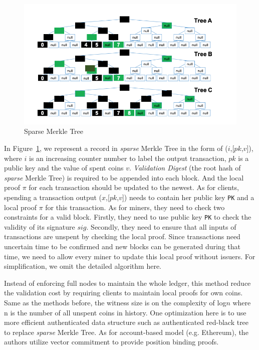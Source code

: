 \documentclass[conference]{IEEEtran}
\begin{document}
\begin{figure}[!ht]
  \centering
  \includegraphics[width=\linewidth]{figs/sparse.png}
  \caption{Sparse Merkle Tree}
  \label{sparse}
\end{figure}

In Figure~\ref{sparse}, we represent a record in \textit{sparse} Merkle Tree in the form of ($i$,[$pk$,$v$]), where $i$ is an increasing counter number to label the output transaction, $pk$ is a public key and the value of spent coins $v$. 
%
\textit{Validation Digest} (the root hash of \textit{sparse} Merkle Tree) is required to be appended into each block.
%
And the local proof $\pi$ for each transaction should be updated to the newest.
%
As for clients, spending a transaction output ($x$,[$pk$,$v$]) needs to contain her public key \texttt{PK} and a local proof $\pi$ for this transaction.
%
As for miners, they need to check two constraints for a valid block.
%
Firstly, they need to use public key \texttt{PK} to check the validity of its signature $sig$.
%
Secondly, they need to ensure that all inputs of transactions are unspent by checking the local proof.
%
Since transactions need uncertain time to be confirmed and new blocks can be generated during that time, we need to allow every miner to update this local proof without issuers.
%
For simplification, we omit the detailed algorithm here.

Instead of enforcing full nodes to maintain the whole ledger, this method reduce the validation cost by requiring clients to maintain local proofs for own coins.
%
Same as the methods before, the witness size is on the complexity of log$n$ where n is the number of all unspent coins in history.
%
One optimization here is to use more efficient authenticated data structure such as authenticated red-black tree to replace \textit{sparse} Merkle Tree.
%
As for account-based model (e.g. Ethereum), the authors utilize vector commitment to provide position binding proofs. 
\end{document}
